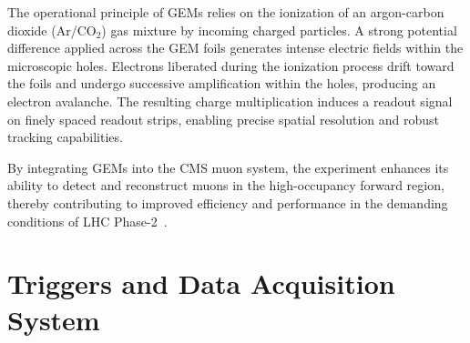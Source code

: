 The operational principle of GEMs relies on the ionization of an argon-carbon dioxide (Ar/CO$_2$) gas mixture by incoming charged particles. A strong potential difference applied across the GEM foils generates intense electric fields within the microscopic holes. Electrons liberated during the ionization process drift toward the foils and undergo successive amplification within the holes, producing an electron avalanche. The resulting charge multiplication induces a readout signal on finely spaced readout strips, enabling precise spatial resolution and robust tracking capabilities.  

By integrating GEMs into the CMS muon system, the experiment enhances its ability to detect and reconstruct muons in the high-occupancy forward region, thereby contributing to improved efficiency and performance in the demanding conditions of LHC Phase-2~\cite{CMS:GEMTDR}.  





\section{Triggers and Data Acquisition System}

